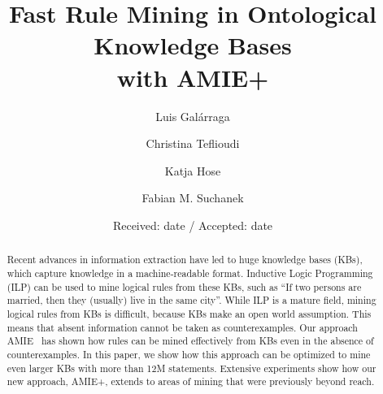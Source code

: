 \documentclass[twocolumn]{svjour3}          %
\begin{document}


\title{Fast Rule Mining in Ontological Knowledge Bases\\ with AMIE+}


\author{Luis Gal\'arraga\and
        Christina Teflioudi \and Katja Hose \and Fabian M. Suchanek
}


\date{Received: date / Accepted: date}

\maketitle

\begin{abstract}
Recent advances in information extraction have led to huge knowledge bases (KBs), which capture knowledge in a ma\-chine-readable format.
Inductive Logic Programming (ILP) can be used to mine logical rules from these KBs, such as ``If two persons are married, then they (usually) live in the same city''.
While ILP is a mature field, mining logical rules from KBs is difficult, because KBs make an open world assumption.
This means that absent information cannot be taken as counterexamples.
Our approach AMIE~\cite{amie} has shown how rules can be mined effectively from KBs even in the absence of counterexamples.
In this paper, we show how this approach can be optimized to mine even larger KBs with more than 12M statements.
Extensive experiments show how our new approach, AMIE+, extends to areas of mining that were previously beyond reach.
\end{abstract}


\end{document}
